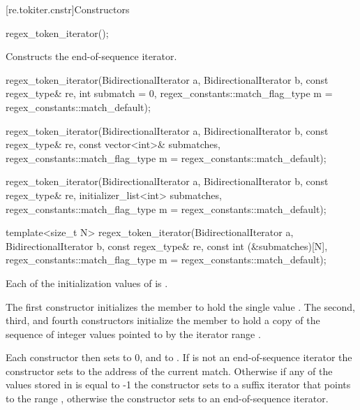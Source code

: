 [re.tokiter.cnstr]{Constructors}

\begin{indexed}{}
\begin{itemdecl}
regex_token_iterator();
\end{itemdecl}
\end{indexed}

\begin{itemdescr}
\pnum
\effects
Constructs the end-of-sequence iterator.
\end{itemdescr}

%
\begin{itemdecl}
regex_token_iterator(BidirectionalIterator a, BidirectionalIterator b,
                     const regex_type& re,
                     int submatch = 0,
                     regex_constants::match_flag_type m = regex_constants::match_default);

regex_token_iterator(BidirectionalIterator a, BidirectionalIterator b,
                     const regex_type& re,
                     const vector<int>& submatches,
                     regex_constants::match_flag_type m = regex_constants::match_default);

regex_token_iterator(BidirectionalIterator a, BidirectionalIterator b,
                     const regex_type& re,
                     initializer_list<int> submatches,
                     regex_constants::match_flag_type m = regex_constants::match_default);

template<size_t N>
  regex_token_iterator(BidirectionalIterator a, BidirectionalIterator b,
                       const regex_type& re,
                       const int (&submatches)[N],
                       regex_constants::match_flag_type m = regex_constants::match_default);
\end{itemdecl}

\begin{itemdescr}
\pnum
\expects
Each of the initialization values of  is .

\pnum
\effects
The first constructor initializes the member  to hold the single
value .
The second, third, and fourth constructors
initialize the member  to hold a copy of the sequence of integer values
pointed to by the iterator range
.

\pnum
Each constructor then sets  to 0, and  to
. If  is not an
end-of-sequence iterator the constructor sets  to the
address of the current match. Otherwise if any of the values stored
in  is equal to -1 the constructor sets  to a suffix
iterator that points to the range , otherwise the constructor
sets  to an end-of-sequence iterator.
\end{itemdescr}


